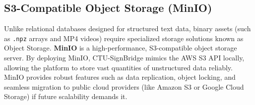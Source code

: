 \subsection{S3-Compatible Object Storage (MinIO)}
Unlike relational databases designed for structured text data, binary assets (such as \texttt{.npz} arrays and MP4 videos) require specialized storage solutions known as Object Storage. \textbf{MinIO} \cite{minio2024} is a high-performance, S3-compatible object storage server. By deploying MinIO, CTU-SignBridge mimics the AWS S3 API locally, allowing the platform to store vast quantities of unstructured data reliably. MinIO provides robust features such as data replication, object locking, and seamless migration to public cloud providers (like Amazon S3 or Google Cloud Storage) if future scalability demands it.
